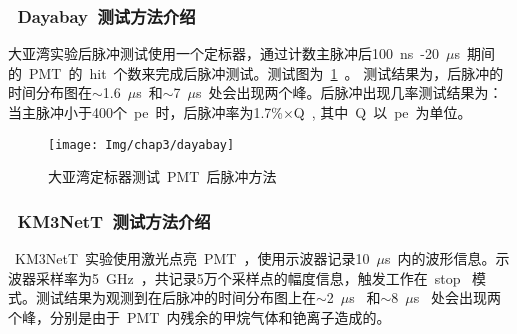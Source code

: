 \subsubsection{~Dayabay~测试方法介绍}
大亚湾实验后脉冲测试使用一个定标器，通过计数主脉冲后100~ns~-20~$\mu$s~期间的~PMT~的~hit~个数来完成后脉冲测试。测试图为~\ref{fig:dayabay}~。 测试结果为，后脉冲的时间分布图在$\sim$1.6~$\mu$s~和$\sim$7~$\mu$s~处会出现两个峰。后脉冲出现几率测试结果为：当主脉冲小于400个~pe~时，后脉冲率为1.7\%$\times$Q~, 其中~Q~以~pe~为单位。
\begin{figure}[!htb]
  \centering
   \texttt{[image: Img/chap3/dayabay]}
    \caption{大亚湾定标器测试~PMT~后脉冲方法}
  \label{fig:dayabay}
\end{figure}
\subsubsection{~KM3NetT~测试方法介绍}
~KM3NetT~实验使用激光点亮~PMT~，使用示波器记录10~$\mu$s~内的波形信息。示波器采样率为5~GHz~，共记录5万个采样点的幅度信息，触发工作在~stop~ 模式。测试结果为观测到在后脉冲的时间分布图上在$\sim$2~$\mu$s~ 和$\sim$8~$\mu$s~ 处会出现两个峰，分别是由于~PMT~内残余的甲烷气体和铯离子造成的。

